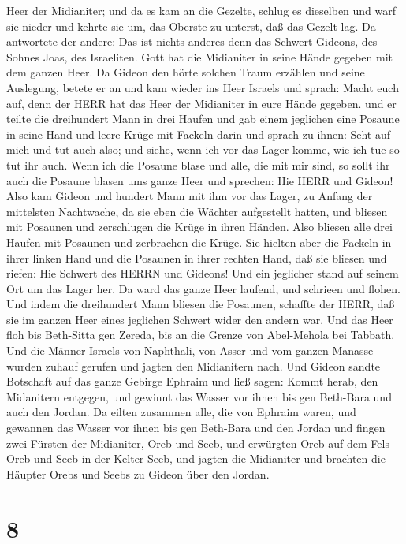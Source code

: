 Heer der Midianiter; und da es kam an die Gezelte, schlug es dieselben
und warf sie nieder und kehrte sie um, das Oberste zu unterst, daß das
Gezelt lag.  Da antwortete der andere: Das ist nichts
anderes denn das Schwert Gideons, des Sohnes Joas, des Israeliten. Gott
hat die Midianiter in seine Hände gegeben mit dem ganzen Heer.
 Da Gideon den hörte solchen Traum erzählen und seine
Auslegung, betete er an und kam wieder ins Heer Israels und sprach:
Macht euch auf, denn der HERR hat das Heer der Midianiter in eure Hände
gegeben.  und er teilte die dreihundert Mann in drei Haufen
und gab einem jeglichen eine Posaune in seine Hand und leere Krüge mit
Fackeln darin  und sprach zu ihnen: Seht auf mich und tut
auch also; und siehe, wenn ich vor das Lager komme, wie ich tue so tut
ihr auch.  Wenn ich die Posaune blase und alle, die mit mir
sind, so sollt ihr auch die Posaune blasen ums ganze Heer und sprechen:
Hie HERR und Gideon!  Also kam Gideon und hundert Mann mit
ihm vor das Lager, zu Anfang der mittelsten Nachtwache, da sie eben die
Wächter aufgestellt hatten, und bliesen mit Posaunen und zerschlugen die
Krüge in ihren Händen.  Also bliesen alle drei Haufen mit
Posaunen und zerbrachen die Krüge. Sie hielten aber die Fackeln in ihrer
linken Hand und die Posaunen in ihrer rechten Hand, daß sie bliesen und
riefen: Hie Schwert des HERRN und Gideons!  Und ein
jeglicher stand auf seinem Ort um das Lager her. Da ward das ganze Heer
laufend, und schrieen und flohen.  Und indem die
dreihundert Mann bliesen die Posaunen, schaffte der HERR, daß sie im
ganzen Heer eines jeglichen Schwert wider den andern war. Und das Heer
floh bis Beth-Sitta gen Zereda, bis an die Grenze von Abel-Mehola bei
Tabbath.  Und die Männer Israels von Naphthali, von Asser
und vom ganzen Manasse wurden zuhauf gerufen und jagten den Midianitern
nach.  Und Gideon sandte Botschaft auf das ganze Gebirge
Ephraim und ließ sagen: Kommt herab, den Midanitern entgegen, und
gewinnt das Wasser vor ihnen bis gen Beth-Bara und auch den Jordan. Da
eilten zusammen alle, die von Ephraim waren, und gewannen das Wasser vor
ihnen bis gen Beth-Bara und den Jordan  und fingen zwei
Fürsten der Midianiter, Oreb und Seeb, und erwürgten Oreb auf dem Fels
Oreb und Seeb in der Kelter Seeb, und jagten die Midianiter und brachten
die Häupter Orebs und Seebs zu Gideon über den Jordan.

\hypertarget{section-7}{%
\section{8}\label{section-7}}

